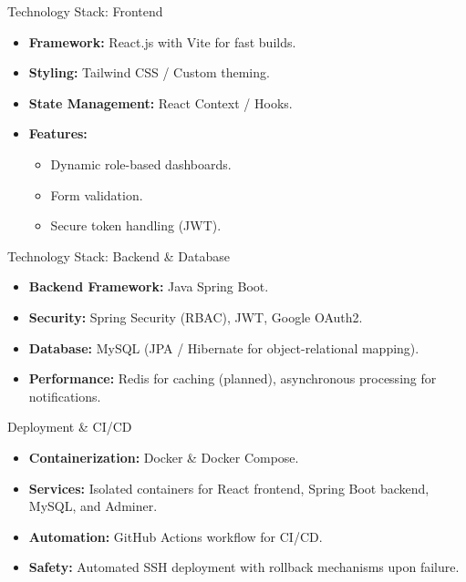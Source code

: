 \documentclass[aspectratio=169]{beamer}
\begin{document}
\begin{frame}{Technology Stack: Frontend}
    \begin{itemize}
        \item \textbf{Framework:} React.js with Vite for fast builds.
        \item \textbf{Styling:} Tailwind CSS / Custom theming.
        \item \textbf{State Management:} React Context / Hooks.
        \item \textbf{Features:}
        \begin{itemize}
            \item Dynamic role-based dashboards.
            \item Form validation.
            \item Secure token handling (JWT).
        \end{itemize}
    \end{itemize}
\end{frame}

\begin{frame}{Technology Stack: Backend \& Database}
    \begin{itemize}
        \item \textbf{Backend Framework:} Java Spring Boot.
        \item \textbf{Security:} Spring Security (RBAC), JWT, Google OAuth2.
        \item \textbf{Database:} MySQL (JPA / Hibernate for object-relational mapping).
        \item \textbf{Performance:} Redis for caching (planned), asynchronous processing for notifications.
    \end{itemize}
\end{frame}

\begin{frame}{Deployment \& CI/CD}
    \begin{itemize}
        \item \textbf{Containerization:} Docker \& Docker Compose.
        \item \textbf{Services:} Isolated containers for React frontend, Spring Boot backend, MySQL, and Adminer.
        \item \textbf{Automation:} GitHub Actions workflow for CI/CD.
        \item \textbf{Safety:} Automated SSH deployment with rollback mechanisms upon failure.
    \end{itemize}
\end{frame}
\end{document}
